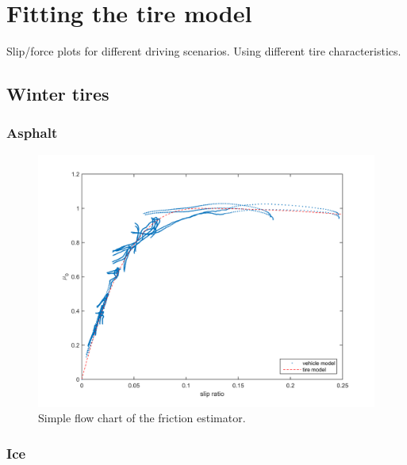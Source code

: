 
\section{Fitting the tire model}

Slip/force plots for different driving scenarios. Using different tire characteristics.

\subsection{Winter tires}

\subsubsection{Asphalt}

\begin{figure}[h]
	\centering
	\includegraphics[width=1.0\textwidth]{Pictures/slip_kraft_ljungby}
	\caption {Simple flow chart of the friction estimator.}
	\label{slip_kraft_ljungby}
\end{figure}

\subsubsection{Ice}

